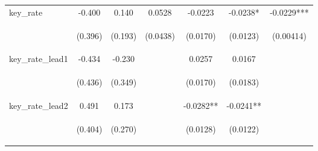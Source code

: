 \documentclass[]{article}
\begin{document}
\begin{center}
\begin{tabular}{lcccccc}
key\_rate & -0.400 & 0.140 & 0.0528 & -0.0223 & -0.0238* & -0.0229*** \\
\vspace{4pt} & \begin{footnotesize}(0.396)\end{footnotesize} & \begin{footnotesize}(0.193)\end{footnotesize} & \begin{footnotesize}(0.0438)\end{footnotesize} & \begin{footnotesize}(0.0170)\end{footnotesize} & \begin{footnotesize}(0.0123)\end{footnotesize} & \begin{footnotesize}(0.00414)\end{footnotesize} \\
key\_rate\_lead1 & -0.434 & -0.230 &  & 0.0257 & 0.0167 &  \\
\vspace{4pt} & \begin{footnotesize}(0.436)\end{footnotesize} & \begin{footnotesize}(0.349)\end{footnotesize} & \begin{footnotesize}\end{footnotesize} & \begin{footnotesize}(0.0170)\end{footnotesize} & \begin{footnotesize}(0.0183)\end{footnotesize} & \begin{footnotesize}\end{footnotesize} \\
key\_rate\_lead2 & 0.491 & 0.173 &  & -0.0282** & -0.0241** &  \\
\vspace{4pt} & \begin{footnotesize}(0.404)\end{footnotesize} & \begin{footnotesize}(0.270)\end{footnotesize} & \begin{footnotesize}\end{footnotesize} & \begin{footnotesize}(0.0128)\end{footnotesize} & \begin{footnotesize}(0.0122)\end{footnotesize} & \begin{footnotesize}\end{footnotesize} \\

\end{tabular}
\end{center}
\end{document}
